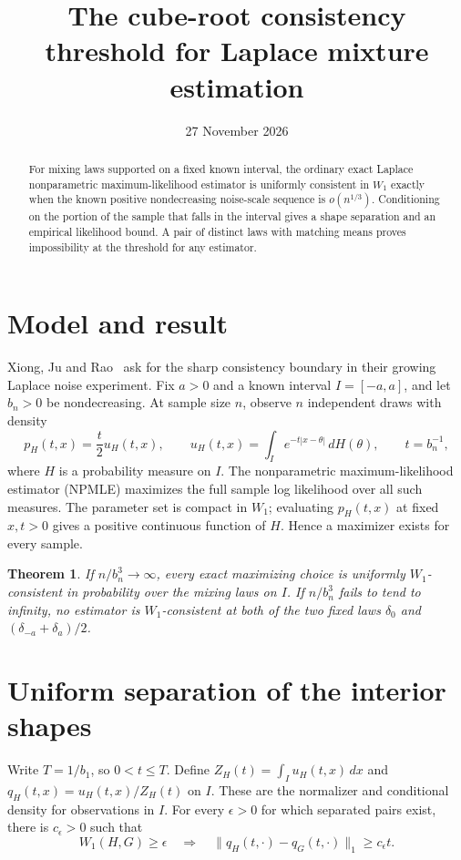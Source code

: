 \documentclass[11pt]{amsart}
\title{The cube-root consistency threshold for Laplace mixture estimation}
\date{27 November 2026}
\newtheorem{theorem}{Theorem}
\begin{document}
\begin{abstract}
For mixing laws supported on a fixed known interval, the ordinary exact Laplace nonparametric maximum-likelihood estimator is uniformly consistent in \(W_1\) exactly when the known positive nondecreasing noise-scale sequence is \(o(n^{1/3})\). Conditioning on the portion of the sample that falls in the interval gives a shape separation and an empirical likelihood bound. A pair of distinct laws with matching means proves impossibility at the threshold for any estimator.
\end{abstract}
\maketitle

\section{Model and result}
Xiong, Ju and Rao~\cite[\S7]{XJR} ask for the sharp consistency boundary in their growing Laplace noise experiment. Fix \(a>0\) and a known interval \(I=[-a,a]\), and let \(b_n>0\) be nondecreasing. At sample size \(n\), observe \(n\) independent draws with density
\[
 p_H(t,x)=\frac{t}{2}u_H(t,x),\qquad
 u_H(t,x)=\int_I e^{-t|x-\theta|}\,dH(\theta),\qquad t=b_n^{-1},
\]
where \(H\) is a probability measure on \(I\). The nonparametric maximum-likelihood estimator (NPMLE) maximizes the full sample log likelihood over all such measures. The parameter set is compact in \(W_1\); evaluating \(p_H(t,x)\) at fixed \(x,t>0\) gives a positive continuous function of \(H\). Hence a maximizer exists for every sample.

\begin{theorem}
If \(n/b_n^3\to\infty\), every exact maximizing choice is uniformly \(W_1\)-consistent in probability over the mixing laws on \(I\). If \(n/b_n^3\) fails to tend to infinity, no estimator is \(W_1\)-consistent at both of the two fixed laws \(\delta_0\) and \((\delta_{-a}+\delta_a)/2\).
\end{theorem}

\section{Uniform separation of the interior shapes}
Write \(T=1/b_1\), so \(0<t\le T\). Define \(Z_H(t)=\int_I u_H(t,x)\,dx\) and \(q_H(t,x)=u_H(t,x)/Z_H(t)\) on \(I\). These are the normalizer and conditional density for observations in \(I\). For every \(\epsilon>0\) for which separated pairs exist, there is \(c_\epsilon>0\) such that
\[
 W_1(H,G)\ge\epsilon\quad\Longrightarrow\quad
        \|q_H(t,\cdot)-q_G(t,\cdot)\|_1\ge c_\epsilon t .
\]
\end{document}
